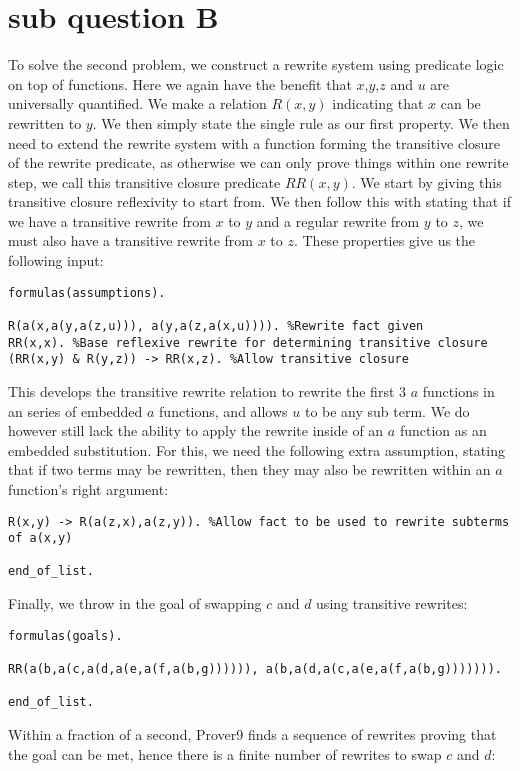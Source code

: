 \section{sub question B}
To solve the second problem, we construct a rewrite system using predicate logic on top of functions. Here we again have the benefit that $x$,$y$,$z$ and $u$ are universally quantified. We make a relation $R(x,y)$ indicating that $x$ can be rewritten to $y$. We then simply state the single rule as our first property. We then need to extend the rewrite system with a function forming the transitive closure of the rewrite predicate, as otherwise we can only prove things within one rewrite step, we call this transitive closure predicate $RR(x,y)$. We start by giving this transitive closure reflexivity to start from. We then follow this with stating that if we have a transitive rewrite from $x$ to $y$ and a regular rewrite from $y$ to $z$, we must also have a transitive rewrite from $x$ to $z$. These properties give us the following input:\\
\begin{verbatim}
formulas(assumptions).

R(a(x,a(y,a(z,u))), a(y,a(z,a(x,u)))). %Rewrite fact given
RR(x,x). %Base reflexive rewrite for determining transitive closure
(RR(x,y) & R(y,z)) -> RR(x,z). %Allow transitive closure
\end{verbatim}
This develops the transitive rewrite relation to rewrite the first $3$ $a$ functions in an series of embedded $a$ functions, and allows $u$ to be any sub term. We do however still lack the ability to apply the rewrite inside of an $a$ function as an embedded substitution. For this, we need the following extra assumption, stating that if two terms may be rewritten, then they may also be rewritten within an $a$ function's right argument:\\
\begin{verbatim}
R(x,y) -> R(a(z,x),a(z,y)). %Allow fact to be used to rewrite subterms of a(x,y)

end_of_list.
\end{verbatim}
Finally, we throw in the goal of swapping $c$ and $d$ using transitive rewrites:\\
\begin{verbatim}
formulas(goals).

RR(a(b,a(c,a(d,a(e,a(f,a(b,g)))))), a(b,a(d,a(c,a(e,a(f,a(b,g))))))).

end_of_list.
\end{verbatim}
Within a fraction of a second, Prover9 finds a sequence of rewrites proving that the goal can be met, hence there is a finite number of rewrites to swap $c$ and $d$:\\
